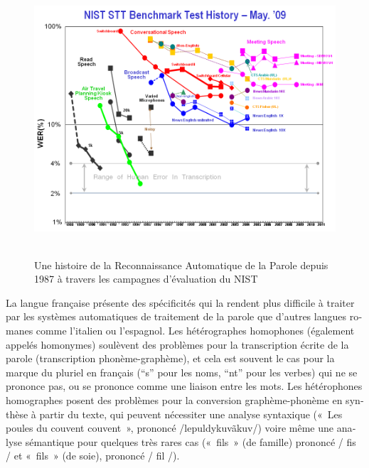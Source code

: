\begin{french}
\begin{multicols}{2}
\begin{figure}[!ht]
\begin{center}
  \includegraphics[height=4.0in]{_media/french/french_pix8_speech_reco_nist.png}
  \caption{Une histoire de la Reconnaissance Automatique de la Parole depuis 1987 à travers les campagnes d'évaluation du NIST~\cite{speechreconist}}
  \label{fig:nistreco}
\end{center}
\end{figure}

La langue française présente des spécificités qui la rendent plus
difficile à traiter par les systèmes automatiques de traitement de la
parole que d'autres langues romanes comme l'italien ou l'espagnol. Les
hétérographes homophones (également appelés homonymes) soulèvent des
problèmes pour la transcription écrite de la parole (transcription
phonème-graphème), et cela est souvent le cas pour la marque du
pluriel en français (``s'' pour les noms, ``nt'' pour les verbes) qui
ne se prononce pas, ou se prononce comme une liaison entre les
mots. Les hétérophones homographes posent des problèmes pour la
conversion graphème-phonème en synthèse à partir du texte, qui peuvent
nécessiter une analyse syntaxique («~Les poules du couvent couvent~»,
prononcé /lepuldykuvãkuv/) voire même une analyse sémantique pour
quelques très rares cas («~fils~» (de famille) prononcé / fis / et
«~fils~» (de soie), prononcé / fil /).


\end{multicols}
\end{french}
